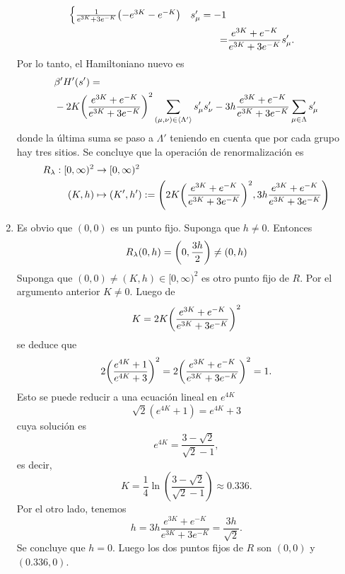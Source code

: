\documentclass{article}
\begin{document}
\begin{enumerate}
\begin{align}
\begin{split}
\begin{cases}
\frac{1}{e^{3K}+3e^{-K}}\qty(-e^{3K}-e^{-K}) & s'_\mu=-1
\end{cases}\\
=&\frac{e^{3K}+e^{-K}}{e^{3K}+3e^{-K}}s'_\mu.
\end{split}
\end{align}
Por lo tanto, el Hamiltoniano nuevo es
\begin{align}
\begin{split}
&\beta' H'(s')=\\
&-2K\qty(\frac{e^{3K}+e^{-K}}{e^{3K}+3e^{-K}})^2\sum_{(\mu,\nu)\in\ev{\Lambda'}}s'_\mu s'_\nu - 3h\frac{e^{3K}+e^{-K}}{e^{3K}+3e^{-K}}\sum_{\mu\in\Lambda}s'_\mu
\end{split}
\end{align}
donde la última suma se paso a $\Lambda'$ teniendo en cuenta que por cada grupo hay tres sitios. Se concluye que la operación de renormalización es
\begin{align}
\begin{split}
R_\lambda:[0,\infty)^2&\rightarrow[0,\infty)^2\\
(K,h)&\mapsto(K',h'):=\qty(2K\qty(\frac{e^{3K}+e^{-K}}{e^{3K}+3e^{-K}})^2,3h\frac{e^{3K}+e^{-K}}{e^{3K}+3e^{-K}})
\end{split}
\end{align}

\item Es obvio que $(0,0)$ es un punto fijo. Suponga que $h\neq 0$. Entonces
\begin{equation}
R_\lambda(0,h)=\qty(0,\frac{3h}{2})\neq(0,h)
\end{equation} 
Suponga que $(0,0)\neq(K,h)\in[0,\infty)^2$ es otro punto fijo de $R$. Por el argumento anterior $K\neq 0$. Luego de 
\begin{equation}
K=2K\qty(\frac{e^{3K}+e^{-K}}{e^{3K}+3e^{-K}})^2
\end{equation}
se deduce que
\begin{equation}
2\qty(\frac{e^{4K}+1}{e^{4K}+3})^2=2\qty(\frac{e^{3K}+e^{-K}}{e^{3K}+3e^{-K}})^2=1.
\end{equation}
Esto se puede reducir a una ecuación lineal en $e^{4K}$
\begin{equation}
\sqrt{2}(e^{4K}+1)=e^{4K}+3
\end{equation}
cuya solución es
\begin{equation}
e^{4K}=\frac{3-\sqrt{2}}{\sqrt{2}-1},
\end{equation}
es decir,
\begin{equation}
K=\frac{1}{4}\ln(\frac{3-\sqrt{2}}{\sqrt{2}-1})\approx 0.336.
\end{equation}
Por el otro lado, tenemos
\begin{equation}
h=3h\frac{e^{3K}+e^{-K}}{e^{3K}+3e^{-K}}=\frac{3h}{\sqrt{2}}.
\end{equation}
Se concluye que $h=0$. Luego los dos puntos fijos de $R$ son $(0,0)$ y $(0.336,0)$.


\end{enumerate}
\end{document}
